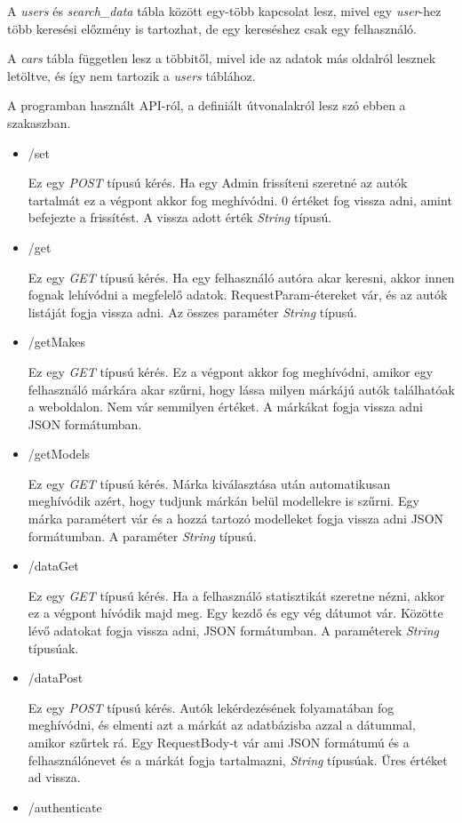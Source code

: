 A \textit{users} és \textit{search\_data} tábla között egy-több kapcsolat lesz, mivel egy \textit{user}-hez több keresési előzmény is tartozhat, de egy kereséshez csak egy felhasználó.

A \textit{cars} tábla független lesz a többitől, mivel ide az adatok más oldalról lesznek letöltve, és így nem tartozik a \textit{users} táblához.

 
A programban használt API-ról, a definiált útvonalakról lesz szó ebben a szakaszban.
\begin{itemize}
\item /set

Ez egy \textit{POST} típusú kérés. Ha egy Admin frissíteni szeretné az autók tartalmát ez a végpont akkor fog meghívódni.
0 értéket fog vissza adni, amint befejezte a frissítést. A vissza adott érték \textit{String} típusú.
\item /get

Ez egy \textit{GET} típusú kérés. Ha egy felhasználó autóra akar keresni, akkor innen fognak lehívódni a megfelelő adatok.
RequestParam-étereket vár, és az autók listáját fogja vissza adni. Az összes paraméter \textit{String} típusú.
\item /getMakes

Ez egy \textit{GET} típusú kérés. Ez a végpont akkor fog meghívódni, amikor egy felhasználó márkára akar szűrni, hogy lássa milyen márkájú autók találhatóak a weboldalon.
Nem vár semmilyen értéket. A márkákat fogja vissza adni JSON formátumban.
\item /getModels

Ez egy \textit{GET} típusú kérés. Márka kiválasztása után automatikusan meghívódik azért, hogy tudjunk márkán belül modellekre is szűrni.
Egy márka paramétert vár és a hozzá tartozó modelleket fogja vissza adni JSON  formátumban. A paraméter \textit{String} típusú.
\item /dataGet

Ez egy \textit{GET} típusú kérés. Ha a felhasználó statisztikát szeretne nézni, akkor ez a végpont hívódik majd meg.
Egy kezdő és egy vég dátumot vár. Közötte lévő adatokat fogja vissza adni, JSON formátumban. A paraméterek \textit{String} típusúak.
\item /dataPost

Ez egy \textit{POST} típusú kérés. Autók lekérdezésének folyamatában fog meghívódni, és elmenti azt a márkát az adatbázisba azzal a dátummal, amikor szűrtek rá.
Egy RequestBody-t vár ami JSON formátumú és a felhasználónevet és a márkát fogja tartalmazni, \textit{String} típusúak. Üres értéket ad vissza.
\item /authenticate


\end{itemize}
